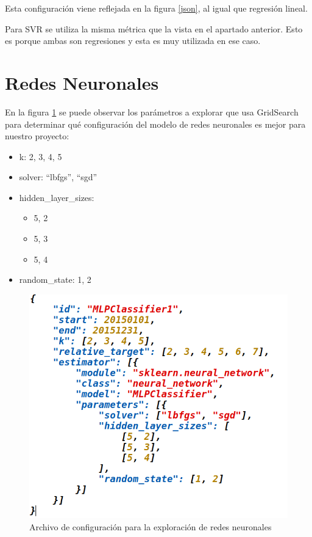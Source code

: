 Esta configuración viene reflejada en la figura \ref{json}, al igual que regresión lineal.

Para SVR se utiliza la misma métrica que la vista en el apartado anterior. Esto es porque ambas son regresiones y esta es muy utilizada en ese caso.

\section{Redes Neuronales}
\label{makereference7.3}

En la figura \ref{json_mlp} se puede observar los parámetros a explorar que usa GridSearch para determinar qué configuración del modelo de redes neuronales es mejor para nuestro proyecto:

\begin{itemize}
\item k: 2, 3, 4, 5
\item solver: ``lbfgs'', ``sgd''
\item hidden\_layer\_sizes:
	\begin{itemize}
	\item 5, 2
	\item 5, 3
	\item 5, 4
	\end{itemize}
\item random\_state: 1, 2
\end{itemize}

\begin{figure}[htb]
	\begin{center}
		\includegraphics[width=12cm]{figures/json_mlp.png}
		\caption{Archivo de configuración para la exploración de redes neuronales \label{json_mlp}}
	\end{center}
\end{figure}

